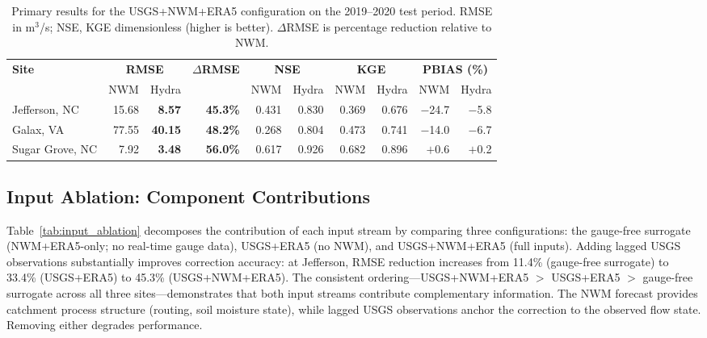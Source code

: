 \documentclass[draft]{agujournal2019}
\begin{document}
\begin{table}
    \centering
    \caption{Primary results for the USGS+NWM+ERA5 configuration on the 2019--2020 test period. RMSE in m$^3$/s; NSE, KGE dimensionless (higher is better). $\Delta$RMSE is percentage reduction relative to NWM.}
    \small
    \begin{tabular}{l rr r rr rr rr}
        \toprule
        \textbf{Site} & \multicolumn{2}{c}{\textbf{RMSE}} & \textbf{$\Delta$RMSE} & \multicolumn{2}{c}{\textbf{NSE}} & \multicolumn{2}{c}{\textbf{KGE}} & \multicolumn{2}{c}{\textbf{PBIAS (\%)}} \\
        \cmidrule(lr){2-3}\cmidrule(lr){5-6}\cmidrule(lr){7-8}\cmidrule(lr){9-10}
         & NWM & Hydra & & NWM & Hydra & NWM & Hydra & NWM & Hydra \\
        \midrule
        Jefferson, NC  & 15.68 & \textbf{8.57}  & \textbf{45.3\%} & 0.431 & 0.830 & 0.369 & 0.676 & $-$24.7 & $-$5.8 \\
        Galax, VA      & 77.55 & \textbf{40.15} & \textbf{48.2\%} & 0.268 & 0.804 & 0.473 & 0.741 & $-$14.0 & $-$6.7 \\
        Sugar Grove, NC& 7.92  & \textbf{3.48}  & \textbf{56.0\%} & 0.617 & 0.926 & 0.682 & 0.896 & $+$0.6  & $+$0.2 \\
        \bottomrule
    \end{tabular}
    \label{tab:primary_results}
\end{table}

\subsection{Input Ablation: Component Contributions}

Table~\ref{tab:input_ablation} decomposes the contribution of each input stream by comparing three configurations: the gauge-free surrogate (NWM+ERA5-only; no real-time gauge data), USGS+ERA5 (no NWM), and USGS+NWM+ERA5 (full inputs). Adding lagged USGS observations substantially improves correction accuracy: at Jefferson, RMSE reduction increases from 11.4\% (gauge-free surrogate) to 33.4\% (USGS+ERA5) to 45.3\% (USGS+NWM+ERA5). The consistent ordering---USGS+NWM+ERA5 $>$ USGS+ERA5 $>$ gauge-free surrogate across all three sites---demonstrates that both input streams contribute complementary information. The NWM forecast provides catchment process structure (routing, soil moisture state), while lagged USGS observations anchor the correction to the observed flow state. Removing either degrades performance.
\end{document}
